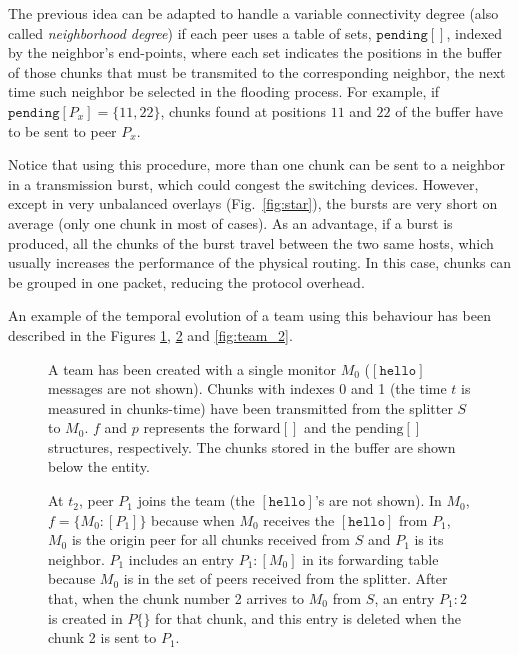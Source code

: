 The previous idea can be adapted to handle a variable connectivity
degree (also called \emph{neighborhood degree}) if each peer uses a
table of sets, $\mathtt{pending}[]$, indexed by the neighbor's
end-points, where each set indicates the positions in the buffer of
those chunks that must be transmited to the corresponding neighbor,
the next time such neighbor be selected in the flooding process. For
example, if $\mathtt{pending}[P_x]=\{11,22\}$, chunks found at
positions $11$ and $22$ of the buffer have to be sent to peer $P_x$.

Notice that using this procedure, more than one chunk can be sent to a
neighbor in a transmission burst, which could congest the switching
devices. However, except in very unbalanced overlays
(Fig.~\ref{fig:star}), the bursts are very short on average (only one
chunk in most of cases). As an advantage, if a burst is produced, all
the chunks of the burst travel between the two same hosts, which
usually increases the performance of the physical routing. In this
case, chunks can be grouped in one packet, reducing the protocol
overhead.

An example of the temporal evolution of a team using this behaviour
has been described in the Figures \ref{fig:team_0}, \ref{fig:team_1}
and \ref{fig:team_2}.

\begin{figure}
  \caption{A team has been created with a single monitor $M_0$
    ($[\mathtt{hello}]$ messages are not shown). Chunks with indexes 0
    and 1 (the time $t$ is measured in chunks-time) have been
    transmitted from the splitter $S$ to $M_0$. $f$ and $p$ represents
    the $\text{forward}[]$ and the $\text{pending}[]$ structures,
    respectively. The chunks stored in the buffer are shown below the
    entity.} %
  \label{fig:team_0}
\end{figure}

\begin{figure}
  \caption{At $t_2$, peer $P_1$ joins the team (the
    $[\mathtt{hello}]$'s are not shown). In $M_0$, $f=\{M_0:[P_1]\}$
    because when $M_0$ receives the $[\mathtt{hello}]$ from $P_1$,
    $M_0$ is the origin peer for all chunks received from $S$ and
    $P_1$ is its neighbor. $P_1$ includes an entry $P_1:[M_0]$ in its
    forwarding table because $M_0$ is in the set of peers received
    from the splitter. After that, when the chunk number 2 arrives to
    $M_0$ from $S$, an entry $P_1:2$ is created in $P\{\}$ for that
    chunk, and this entry is deleted when the chunk 2 is sent to
    $P_1$.} %
  \label{fig:team_1}
\end{figure}

